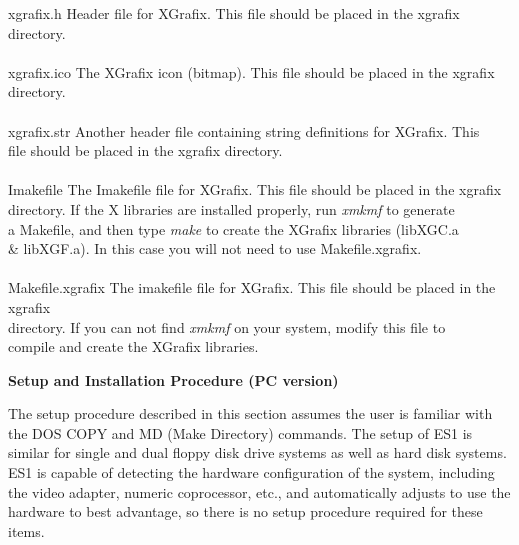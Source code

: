 \begin{section}
\begin{subsection}
\begin{tabbing}
        xgrafix.h   \>   Header file for XGrafix.  This file should be
                       placed in the xgrafix \> \\
		    \> directory. \> \\	
										\\

        xgrafix.ico \>   The XGrafix icon (bitmap).  This file should be placed in the xgrafix directory. \> \\	
										\\

        xgrafix.str \>   Another header file containing string definitions for XGrafix.  This \> \\
		    \> file should be placed in the xgrafix directory. \> \\
									\\
        Imakefile    \> The Imakefile file for XGrafix.  This file should be placed in the xgrafix \> \\
		     \> directory.  If the X libraries are installed properly, run {\em xmkmf} to generate \> \\
		     \> a Makefile, and then type {\em make} to create the XGrafix libraries (libXGC.a \> \\
		     \> \& libXGF.a). In this case you will not need to use Makefile.xgrafix. \> \\
								\\
        Makefile.xgrafix    \>  The imakefile file for XGrafix.  This file should be placed in the xgrafix \> \\
		    \> directory. If you can not find {\em xmkmf} on your system, modify this file to \> \\
		    \> compile and create the XGrafix libraries. \> 
								\\
\end{tabbing}
\end{subsection}

\begin{subsection}
{\bf Setup and Installation Procedure (PC version)}

   The setup procedure described in this section assumes the user is familiar
   with the DOS COPY and MD (Make Directory) commands.  The setup of ES1 is
   similar for single and dual floppy disk drive systems as well as hard disk
   systems.  ES1 is capable of detecting the hardware configuration of the
   system, including the video adapter, numeric coprocessor, etc., and
   automatically adjusts to use the hardware to best advantage, so there is no
   setup procedure required for these items.
\vspace{.2in}


\end{subsection}
\end{section}
